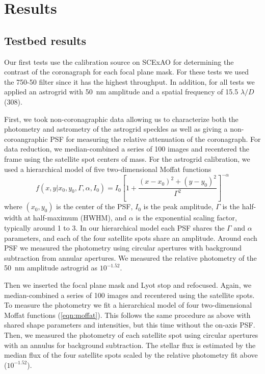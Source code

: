 \documentclass[]{spie}  %
\begin{document}
\section{Results}\label{sec:results}

\subsection{Testbed results}\label{sec:testbed}

Our first tests use the calibration source on SCExAO for determining the contrast of the coronagraph for each focal plane mask. For these tests we used the 750-50 filter since it has the highest throughput. In addition, for all tests we applied an astrogrid with \qty{50}{\nano\meter} amplitude and a spatial frequency of 15.5 $\lambda/D$ (\qty{308}{\milliarcsecond}).

First, we took non-coronagraphic data allowing us to characterize both the photometry and astrometry of the astrogrid speckles as well as giving a non-coroangraphic PSF for measuring the relative attenuation of the coronagraph. For data reduction, we median-combined a series of 100 images and recentered the frame using the satellite spot centers of mass. For the astrogrid calibration, we used a hierarchical model of five two-dimensional Moffat functions
\begin{equation}
   \label{eqn:moffat}
   f(x, y | x_0, y_0, \Gamma, \alpha, I_0) = I_0 \left[1 + \frac{\left(x-x_0\right)^2 + \left(y-y_0\right)^2}{\Gamma^2} \right]^{-\alpha}
\end{equation}
where $(x_0, y_0)$ is the center of the PSF, $I_0$ is the peak amplitude, $\Gamma$ is the half-width at half-maximum (HWHM), and $\alpha$ is the exponential scaling factor, typically around 1 to 3. In our hierarchical model each PSF shares the $\Gamma$ and $\alpha$ parameters, and each of the four satellite spots share an amplitude. Around each PSF we measured the photometry using circular apertures with background subtraction from annular apertures. We measured the relative photometry of the \qty{50}{\nano\meter} amplitude astrogrid as $10^{-1.52}$.

Then we inserted the focal plane mask and Lyot stop and refocused. Again, we median-combined a series of 100 images and recentered using the satellite spots. To measure the photometry we fit a hierarchical model of four two-dimensional Moffat functions (\autoref{eqn:moffat}). This follows the same procedure as above with shared shape parameters and intensities, but this time without the on-axis PSF. Then, we measured the photometry of each satellite spot using circular apertures with an annulus for background subtraction. The stellar flux is estimated by the median flux of the four satellite spots scaled by the relative photometry fit above ($10^{-1.52}$). 
\end{document}
